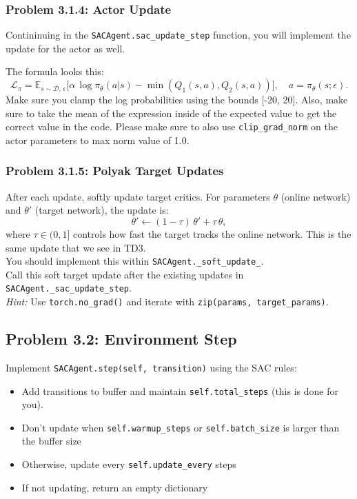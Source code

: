 \documentclass[12pt]{article}
\begin{document}
\subsubsection*{Problem 3.1.4: Actor Update}
Contininuing in the \texttt{SACAgent.sac\_update\_step} function, you will implement the update for the actor as well.

The formula looks this:
\begin{equation}
\mathcal{L}_\pi = \mathbb{E}_{s\sim\mathcal{D},\,\epsilon}\Big[\alpha\,\log\pi_\theta(a|s) - \min(Q_1(s,a), Q_2(s,a))\Big],\quad a=\pi_\theta(s;\epsilon).
\end{equation}
Make sure you clamp the log probabilities using the bounds [-20, 20]. Also, make sure to take the mean of the expression inside of the expected value to get the correct value in the code. Please make sure to also use \texttt{clip_grad_norm} on the actor parameters to max norm value of 1.0. 

\subsubsection*{Problem 3.1.5: Polyak Target Updates}
After each update, softly update target critics.  For parameters \(\theta\) (online network) and \(\theta'\) (target network), the update is:
\begin{equation}
\theta' \leftarrow (1-\tau)\,\theta' + \tau\,\theta,
\end{equation}
where \(\tau \in (0,1]\) controls how fast the target tracks the online network. This is the same update that we see in TD3. \\
You should implement this within  \texttt{SACAgent._soft\_update\_}. \\
Call this soft target update after the existing updates in \texttt{SACAgent._sac_update_step}.\\
\textit{Hint:} Use \texttt{torch.no\_grad()} and iterate with \texttt{zip(params, target\_params)}.

\subsection*{Problem 3.2: Environment Step}
Implement \texttt{SACAgent.step(self, transition)} using the SAC rules:
\begin{itemize}
  \item Add transitions to buffer and maintain \texttt{self.total\_steps} (this is done for you).
  \item Don't update when \texttt{self.warmup\_steps} or \texttt{self.batch_size} is larger than the buffer size
  \item Otherwise, update every \texttt{self.update\_every} steps
  \item If not updating, return an empty dictionary
\end{itemize}
\end{document}
